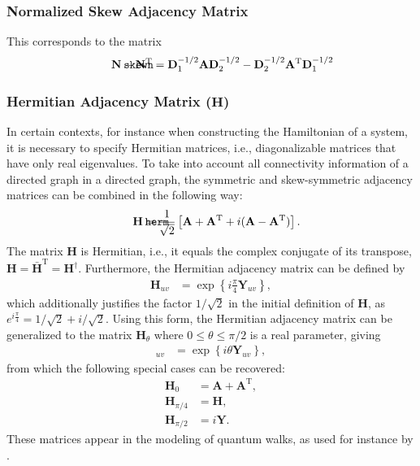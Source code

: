 \documentclass{article}
\def\mathnote#1{%
  \tag*{\rlap{\hspace\marginparsep\smash{\parbox[t]{\marginparwidth}{#1}}}}
}
\begin{document}
\subsubsection{Normalized Skew Adjacency Matrix}
This corresponds to the matrix
\begin{align}
  \mathnote{\texttt{skewn}}
  \mathbf N - \mathbf N^{\mathrm T} = 
  \mathbf D_1^{-1/2} \mathbf A \mathbf D_2^{-1/2} - 
  \mathbf D_2^{-1/2} \mathbf A^{\mathrm T} \mathbf D_1^{-1/2} 
\end{align}

\subsubsection{Hermitian Adjacency Matrix ($\mathbf H$)}
In certain contexts, for instance when constructing the Hamiltonian of a
system, it is necessary to specify Hermitian matrices, i.e.,
diagonalizable matrices that have only real eigenvalues.  To take into
account all connectivity information of a directed graph in a
directed graph, the symmetric and skew-symmetric adjacency matrices can
be combined in the following way:
\begin{align}
  \mathnote{\texttt{herm}}
  \mathbf H &= \frac 1 {\sqrt 2} \left[
  \mathbf A + \mathbf A^{\mathrm T} + i(\mathbf A - \mathbf A^{\mathrm T})
  \right]. 
\end{align}
The matrix $\mathbf H$ is Hermitian, i.e., it equals the complex
conjugate of its transpose, $\mathbf H = \mathbf {\bar H}^{\mathrm T} =
\mathbf H^{\dagger}$.
Furthermore, the Hermitian adjacency matrix can be defined by
\begin{align}
  \mathbf H_{uv} &= \exp\left\{i \frac \pi 4 \mathbf Y_{uv}\right\},
\end{align}
which additionally justifies the factor $1/\sqrt 2$ in the initial
definition of $\mathbf H$, as $e^{i \frac \pi 4} = 1/\sqrt 2 + i/\sqrt
2$.  Using this form, the Hermitian adjacency matrix can be generalized
to the matrix $\mathbf H_\theta$ where $0 \leq \theta \leq \pi/2$ is a
real parameter, giving 
\begin{align}
  [\mathbf H_{\theta}]_{uv} &= \exp\left\{i \theta \mathbf Y_{uv} \right\},  
\end{align}
from which the following special cases can be recovered:
\begin{align}
  \mathbf H_0 &= \mathbf A + \mathbf A^{\mathrm T}, \\
  \mathbf H_{\pi/4} &= \mathbf H, \\
  \mathbf H_{\pi/2} &= i \mathbf Y.
\end{align}
These matrices appear in the modeling of quantum walks, as used for
instance by \cite{toedtli:ctqw}.  
\end{document}
